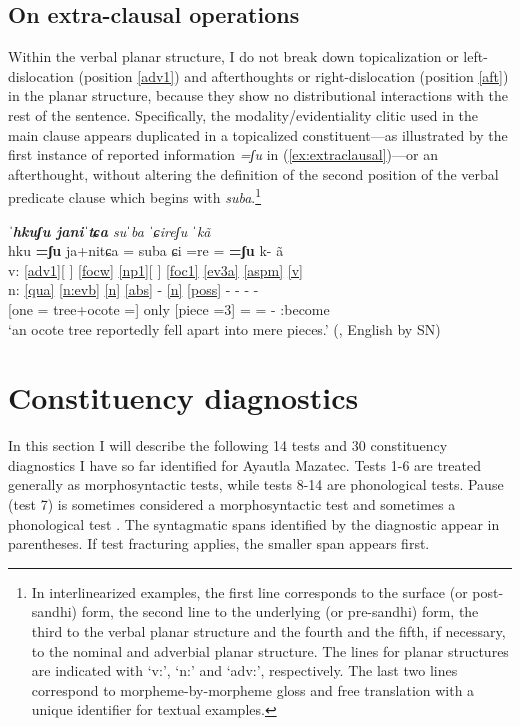 \documentclass[output=paper]{langscibook}
\begin{document}
\subsection{On extra-clausal operations}\label{sec-extraclausal}
Within the verbal planar structure, I do not break down topicalization or left-dislocation (position \ref{adv1}) and afterthoughts or right-dislocation (position \ref{aft}) in the planar structure, because they show no distributional interactions with the rest of the sentence. Specifically, the modality/evidentiality clitic used in the main clause appears duplicated in a topicalized constituent—as illustrated by the first instance of reported information \textit{=ʃu\3\ff} in (\ref{ex:extraclausal})—or an afterthought, without altering the definition of the second position of the verbal predicate clause which begins with \textit{su\2ba\4}.\footnote{In interlinearized examples, the first line corresponds to the surface (or post-sandhi) form, the second line to the underlying (or pre-sandhi) form, the third to the verbal planar structure and the fourth and the fifth, if necessary, to the nominal and adverbial planar structure. The lines for planar structures are indicated with `v:', `n:' and `adv:', respectively. The last two lines correspond to morpheme-by-morpheme gloss and free translation with a unique identifier for textual examples.}

\ea \label{ex:extraclausal}
\textit{\textbf{ˈh\ssn ku\2\3ʃu\3	ja\2ni\4ˈtɕa\2\1} su\2ˈba\4	ˈɕi\1re\1\3ʃu\3  ˈk\lab{}ã\2\4} \\
\gllll
{} h\ssn{}ku\2\3	\textbf{=ʃu\3\ff{}}	ja\3\ff+ni\2tɕa\2	=\1	su\2ba\4	ɕi\1 	=re\1	=\3\ff{}		\textbf{=ʃu\3\ff{}}	k\lab{}-		ã\2\4 \\
v: \ref{adv1}[	{}			{}			{}]	\ref{focw}	\ref{np1}[ {}]		\ref{foc1}	\ref{ev3a}	\ref{aspm}	\ref{v}\\
n: \ref{qua}		\ref{n:evb}	\ref{n}				\ref{abs} -		\ref{n}	\ref{poss}	- 		-		 	- 			-\\
{} \textsubscript{\Top}[one			{=\Rep}		tree+ocote			{=\Abst}] only	[piece	{=\Poss}3] {=\Foc}	{=\Rep}		\Pfv- \Pfv:become\\
\glt `an ocote tree reportedly fell apart into mere pieces.' (\citealt[139]{sanchez20}, English by SN)
\z


\section{Constituency diagnostics}\label{sec-diag}
In this section I will describe the following 14 tests and 30 constituency diagnostics I have so far identified for Ayautla Mazatec. Tests 1-6 are treated generally as morphosyntactic tests, while tests 8-14 are phonological tests. Pause (test 7) is sometimes considered a morphosyntactic test \citep[cf.][]{haspelmathword:2011} and sometimes a phonological test \citep[cf.][]{dixonaikhenvald02,gerdts14}. The syntagmatic spans identified by the diagnostic appear in parentheses. If test fracturing applies, the smaller span appears first.
\end{document}
